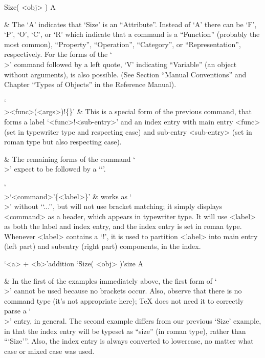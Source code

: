 \begintt
\>Size( <obj> ) A
\endtt

  & The `A' indicates that `Size' is an  ``Attribute''.  Instead  of  `A'
    there can be `F', `P', `O', `C', or `R' which indicate that a command
    is  a  ``Function''  (probably  the   most   common),   ``Property'',
    ``Operation'', ``Category'', or ``Representation'', respectively. For
    the forms of  the  `\\>'  command  followed  by  a  left  quote,  `V'
    indicating  ``Variable''  (an  object  without  arguments),  is  also
    possible.  (See Section ``Manual Conventions'' and
    Chapter ``Types of Objects'' in the {\GAP} Reference Manual).

`\\><func>(<args>)!\{<sub-entry>\}' &
    This is a special form of the previous command, that  forms  a  label
    `<func>!<sub-entry>' and an index entry with main entry  <func>  (set
    in typewriter type and respecting  case)  and  sub-entry  <sub-entry>
    (set in roman type but also respecting case).

  & The remaining forms of the command `\\>' expect to be followed by a
    `\lq'.

`\\>\lq<command>\rq\{<label>\}' &
    works  as  `\\>'  without  `\lq...\rq',  but  will  not  use  bracket
    matching; it simply displays <command> as a header, which appears  in
    typewriter type. It will use <label> as  both  the  label  and  index
    entry, and the index entry is set in  roman  type.  Whenever  <label>
    contains a `!', it is used to partition <label> into main entry (left
    part) and subentry (right part) components, in the index.

\begintt
\>`<a> + <b>'{addition}
\>`Size( <obj> )'{size} A
\endtt

  & In the first of the examples immediately above,  the  first  form  of
    `\\>' cannot be used because no brackets occur.  Also,  observe  that
    there is no command type (it's not appropriate here); {\TeX} does not
    need it to correctly parse a `\\>'  entry,  in  general.  The  second
    example differs from our previous `Size' example, in that  the  index
    entry will be typeset  as  ``size''  (in  roman  type),  rather  than
    ``{`Size'}''. Also, the index entry is always converted to lowercase,
    no matter what case or mixed case was used.

